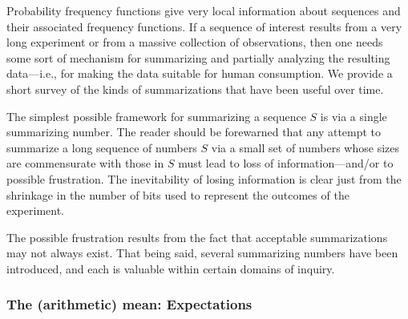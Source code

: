 
\bigskip

Probability frequency functions give very local information about sequences and their associated frequency functions.  If a sequence of interest results from a very long experiment or from a massive collection of observations, then one needs some sort of mechanism for summarizing and partially analyzing the resulting data---i.e., for making the data suitable for human consumption.  We provide a short survey of the kinds of summarizations that have been useful over time.

\medskip

The simplest possible framework for summarizing a sequence $S$ is via a single summarizing number. The reader should be forewarned that any attempt to summarize a long sequence of numbers $S$ via a small set of numbers whose sizes are commensurate with those in $S$ must lead to loss of information---and/or to possible frustration.  The inevitability of losing information is clear just from the shrinkage in the number of bits used to represent the outcomes of the experiment.

\bigskip

\noindent {}

\bigskip

\noindent
The possible frustration results from the fact that acceptable summarizations may not
always exist.   That being said, several summarizing numbers have been introduced, and
each is valuable within certain domains of inquiry. 

\subsubsection{The (arithmetic) mean: Expectations}
\label{sec:mean}

